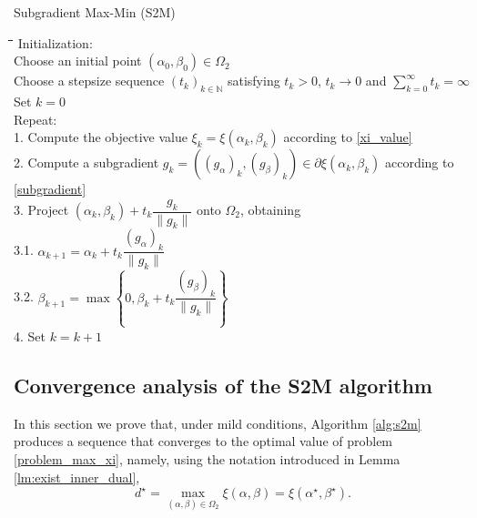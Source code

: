 \documentclass[smallextended,referee,envcountsect]{svjour3}
\newcommand{\N}{\mathbb{N}}
\begin{document}
\begin{algorithm}
\caption{Subgradient Max-Min (S2M)}
\label{alg:s2m}
\begin{tabbing}
\hspace*{7mm}\=\hspace*{7mm}\=\hspace*{7mm}\=\hspace*{7mm}\=
\hspace*{7mm}\=\hspace*{7mm}\=\kill
{\sc Initialization}: \+ \\ Choose an initial point 
$(\alpha_0,\beta_0)\in\Omega_2$ \\ 
Choose a stepsize sequence $(t_k)_{k\in\N}$ satisfying $t_k>0$, $t_k\to 0$ and 
$\sum\limits_{k=0}^{\infty}t_k=\infty$ \- \\ 
Set $k=0$ \\
{\sc Repeat}: \+ \\
1. Compute the objective value $\xi_k=\xi(\alpha_k,\beta_k)$ 
according to \eqref{xi_value} \\ 
2. Compute a subgradient $g_k=((g_\alpha)_k,(g_\beta)_k)\in\partial\xi(\alpha_k,\beta_k)$ 
according to \eqref{subgradient} \\ 
3. Project $(\alpha_k,\beta_k)+t_k\dfrac{g_k}{\|g_k\|}$ onto $\Omega_2$, 
obtaining \+ \\ 
3.1. $\alpha_{k+1}=\alpha_k+t_k\dfrac{(g_\alpha)_k}{\|g_k\|}$ \\ 
3.2. $\beta_{k+1}=\max\left\{0,\beta_k+t_k\dfrac{(g_\beta)_k}{\|g_k\|}\right\}$ \- \\ 
4. Set $k=k+1$
\end{tabbing} 
\end{algorithm}


\subsection{Convergence analysis of the S2M algorithm}
\label{sec:conv}
In this section we prove that, under mild conditions, 
Algorithm \ref{alg:s2m} produces a sequence that converges to the optimal 
value of problem \eqref{problem_max_xi}, namely, using the notation introduced in 
Lemma \ref{lm:exist_inner_dual}, 
$$
d^\star = \max_{(\alpha,\beta)\in\Omega_2}\xi(\alpha,\beta) = 
\xi(\alpha^\star,\beta^\star).
$$ 
\end{document}
